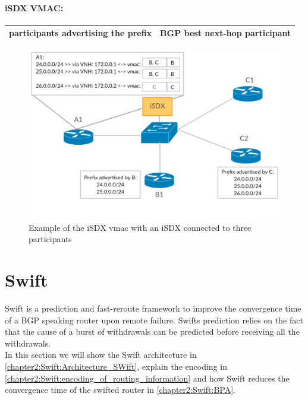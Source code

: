 \paragraph{\label{chapter2:iSDX:virtual next-hop :inbound policies}iSDX VMAC:}

\begin{tabular}{|r|l|}
  \hline 
  participants advertising the prefix & BGP best next-hop participant \\
  \hline
\end{tabular}

\begin{figure}[h]
\includegraphics[scale = 0.36]{Figures/intro_sdx_vmac.pdf}
\caption{Example of the iSDX vmac with an iSDX connected to three participants}
\label{fig:isdx_vmac}
\end{figure}

\section{\label{chapter2:Swift}Swift}


Swift is a prediction and fast-reroute framework to improve the convergence time of a BGP speaking router upon remote failure. Swifts prediction relies on the fact that the cause of a burst of withdrawals can be predicted before receiving all the withdrawals. \\
In this section we will show the Swift architecture in \ref{chapter2:Swift:Architecture_SWift}, explain the encoding in \ref{chapter2:Swift:encoding_of_routing_information} and how Swift reduces the convergence time of the swifted router in \ref{chapter2:Swift:BPA}.


